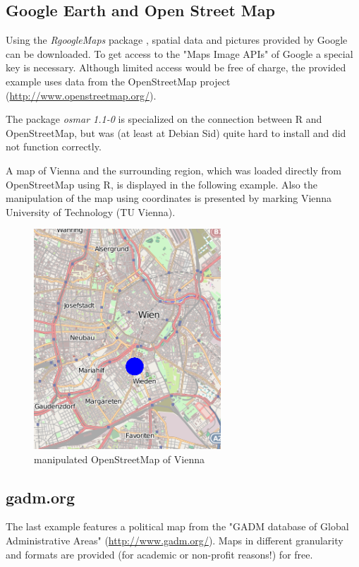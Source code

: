 \documentclass{ifacconf}
\begin{document}
\subsection{Google Earth and Open Street Map}
Using the \textit{RgoogleMaps} package \citep{RgoogleMaps}, spatial data and
pictures provided by Google can be downloaded. To get access to the 
"Maps Image APIs" of Google a special key is necessary. Although limited access would be free
of charge, the provided example uses data from the OpenStreetMap project 
(\url{http://www.openstreetmap.org/}).

The package \textit{osmar 1.1-0} is specialized on the connection
between R and OpenStreetMap, but was (at least at Debian Sid) quite hard to install
and did not function correctly.

A map of Vienna and the surrounding region, which was loaded directly
from OpenStreetMap using R, is displayed in the following example. 
Also the manipulation of the map using coordinates is presented by marking
Vienna University of Technology (TU Vienna).


\begin{figure}[h]
\begin{center}
\includegraphics[width=7cm, angle=90]{pics/hometu.png}    %
\caption{manipulated OpenStreetMap of Vienna} 
\label{fig:hometu}
\end{center}
\end{figure}


\subsection{gadm.org}
The last example features a political map from 
the "GADM database of Global Administrative Areas" (\url{http://www.gadm.org/}).
Maps in different granularity and formats are provided (for academic or
non-profit reasons!) for free.
\end{document}

